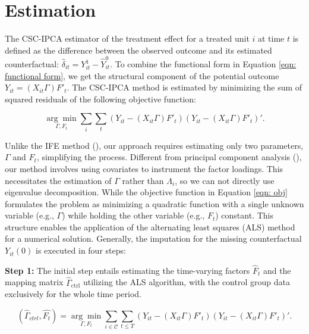 \documentclass[12pt]{article}
\begin{document}
\section{Estimation}
\label{sec: estimation}
The CSC-IPCA estimator of the treatment effect for a treated unit $i$ at time $t$ is defined as the difference between the observed outcome and its estimated counterfactual: $\hat{\delta}_{it} = Y_{it}^1 - \hat{Y}_{it}^0$. To combine the functional form in Equation \ref{eqn: functional form}, we get the structural component of the potential outcome $Y_{it} = (X_{it}\Gamma) F'_{t}$. The CSC-IPCA method is estimated by minimizing the sum of squared residuals of the following objective function:

\begin{equation}
\label{eqn: obj}
\underset{\Gamma, F_t}{\arg\min} \sum_{i} \sum_{t}\left( Y_{it} - (X_{it}\Gamma) F'_{t} \right)\left( Y_{it} - (X_{it}\Gamma) F'_{t} \right)'.
\end{equation}

Unlike the IFE method (\cite{bai2009panel,xu2017generalized}), our approach requires estimating only two parameters, $\Gamma$ and $F_t$, simplifying the process. Different from principal component analysis (\cite{jolliffe2002principal,stock2002forecasting}), our method involves using covariates to instrument the factor loadings. This necessitates the estimation of $\Gamma$ rather than $\Lambda_i$, so we can not directly use eigenvalue decomposition. While the objective function in Equation \ref{eqn: obj} formulates the problem as minimizing a quadratic function with a single unknown variable (e.g., $\Gamma$) while holding the other variable (e.g., $F_t$) constant. This structure enables the application of the alternating least squares (ALS) method for a numerical solution. Generally, the imputation for the missing counterfactual $Y_{it}(0)$ is executed in four steps:

\textbf{Step 1:} The initial step entails estimating the time-varying factors $\hat{F}_t$ and the mapping matrix $\hat{\Gamma}_{\text{ctrl}}$ utilizing the ALS algorithm, with the control group data exclusively for the whole time period.

\begin{equation}
(\hat{\Gamma}_{ctrl}, \hat{F_t}) = \underset{\Gamma, F_t}{\arg\min} \sum_{i \in \mathcal{C}} \sum_{t \leq T}\left( Y_{it} - (X_{it}\Gamma) F'_{t} \right)\left( Y_{it} - (X_{it}\Gamma) F'_{t} \right)'.
\label{eq: optimization}
\end{equation}
\end{document}

